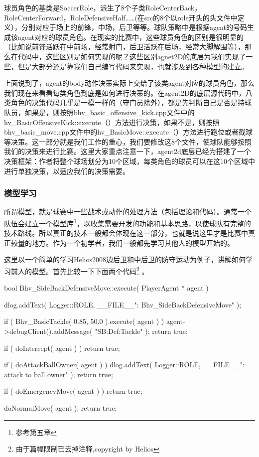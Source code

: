 球员角色的基类是SoccerRole，派生了8个子类RoleCenterBack，RoleCenterForward，RoleDefensiveHalf……(在src的8个以role开头的头文件中定义），分别对应于场上的前锋，中场，后卫等等。球队策略中是根据agent的号码生成该agent对应的球员角色。在现实的比赛中，这些球员角色的区别是很明显的（比如说前锋活跃在中前场，经常射门，后卫活跃在后场，经常大脚解围等），那么在代码中，这些区别是如何实现的呢？这些区别agnet2D的底层为我们实现了一些，但是大部分还是靠我们自己编写代码来实现，也就涉及到各种模型的建立。

上面说到了，agent的body动作决策实际上交给了该类agent对应的球员角色，那么我们现在来看看每类角色到底是如何进行决策的。在agent2D的底层源代码中，八类角色的决策代码几乎是一模一样的（守门员除外），都是先判断自己是否是持球队员，如果是，则按照bhv_basic_offensive_kick.cpp文件中的hv_BasicOffensiveKick::execute（）方法进行决策，如果不是，则按照bhv_basic_move.cpp文件中的hv_BasicMove::execute（）方法进行跑位或者截球等决策。这一部分就是我们工作的重心，我们要修改这8个文件，使球队能够按照我们的决策来进行比赛。这里大家重点注意一下，agent2d底层已经为搭建了一个决策框架：作者将整个球场划分为10个区域，每类角色的球员可以在这10个区域中进行单独决策，以适应我们的决策需要。
\subsubsection{模型学习}
所谓模型，就是球赛中一些战术或动作的处理方法（包括理论和代码）。通常一个队伍会建立一个模型库\footnote{参考第五章}，以收集需要开发的功能和基本思路，以使球队有完整的技术路线。所以真正的技术一般都会体现在这一部分，也就是说这里才是比赛中真正较量的地方。作为一个初学者，我们一般都先学习其他人的模型开始的。

这里以一个简单的学习Helios2008边后卫和中后卫的防守运动为例子，讲解如何学习前人的模型。首先比较一下下面两个代码\footnote{由于篇幅限制已去掉注释,copyright by Helios} 。

\begin{Codex}[label=bhv_side_back_defensive_move.cpp]
bool
Bhv_SideBackDefensiveMove::execute( PlayerAgent * agent )
{
	dlog.addText( Logger::ROLE,
	__FILE__": Bhv_SideBackDefensiveMove" );

	if ( Bhv_BasicTackle( 0.85, 50.0 ).execute( agent ) )
	{
		agent->debugClient().addMessage( "SB:Def:Tackle" );
		return true;
	}
	
	if ( doIntercept( agent ) )
	{
		return true;
	}
	
	if ( doAttackBallOwner( agent ) )
	{
		dlog.addText( Logger::ROLE,
		__FILE__": attack to ball owner" );
		return true;
	}
	
	if ( doEmergencyMove( agent ) )
	{
		return true;
	}
	
	doNormalMove( agent );
	return true;
	
}
\end{Codex}

